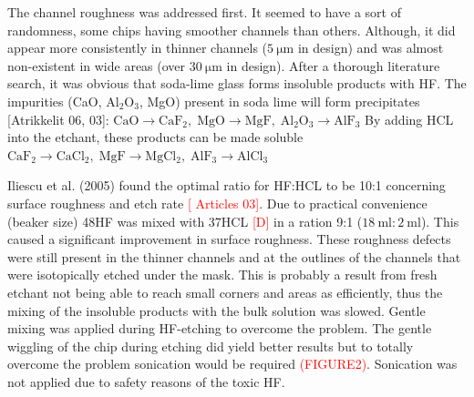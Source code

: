 \documentclass[draft]{jyflluk}
\begin{document}
The channel roughness was addressed first. It seemed to have a sort of randomness, some chips having smoother channels than others. Although, it did appear more consistently in thinner channels ($\SI{5}{\micro \metre}$ in design) and was almost non-existent in wide areas (over $\SI{30}{\micro \metre}$ in design). After a thorough literature search, it was obvious that soda-lime glass forms insoluble products with HF. The impurities (CaO, $\mathrm{Al_2 O_3}$, MgO) present in soda lime will form precipitates [Atrikkelit 06, 03]:
\newline
$\mathrm{ CaO \rightarrow CaF_2,\; MgO \rightarrow MgF, \; Al_2 O_3 \rightarrow AlF_3}$
\newline
By adding HCL into the etchant, these products can be made soluble
\newline
$\mathrm{CaF_2 \rightarrow CaCl_2, \; MgF \rightarrow MgCl_2, \; AlF_3 \rightarrow AlCl_3}$
\newline

Iliescu et al. (2005) found the optimal ratio for HF:HCL to be 10:1 concerning surface roughness and etch rate \textcolor{red}{[ Articles 03]}. Due to practical convenience (beaker size) 48\percent HF was mixed with 37\percent HCL \textcolor{red}{[D]} in a ration 9:1 ($\SI{18}{\milli \litre}:\SI{2}{\milli \litre}$). This caused a significant improvement in surface roughness. These roughness defects were still present in the thinner channels and at the outlines of the channels that were isotopically etched under the mask. This is probably a result from fresh etchant not being able to reach small corners and areas as efficiently, thus the mixing of the insoluble products with the bulk solution was slowed. Gentle mixing was applied during HF-etching to overcome the problem. The gentle wiggling of the chip during etching did yield better results but to totally overcome the problem sonication would be required \textcolor{red}{(FIGURE2)}. Sonication was not applied due to safety reasons of the toxic HF.
\end{document}
